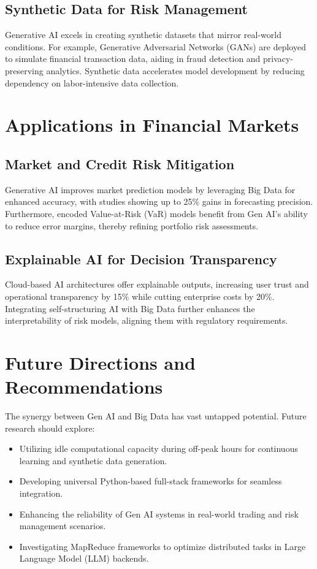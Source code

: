 \documentclass[a4paper,headinclude=on,footinclude=on,12pt,oneside]{scrbook}
\begin{document}
\subsection{Synthetic Data for Risk Management}
Generative AI excels in creating synthetic datasets that mirror real-world conditions. For example, Generative Adversarial Networks (GANs) are deployed to simulate financial transaction data, aiding in fraud detection and privacy-preserving analytics. Synthetic data accelerates model development by reducing dependency on labor-intensive data collection.

\section{Applications in Financial Markets}

\subsection{Market and Credit Risk Mitigation}
Generative AI improves market prediction models by leveraging Big Data for enhanced accuracy, with studies showing up to 25\% gains in forecasting precision. Furthermore, encoded Value-at-Risk (VaR) models benefit from Gen AI’s ability to reduce error margins, thereby refining portfolio risk assessments.

\subsection{Explainable AI for Decision Transparency}
Cloud-based AI architectures offer explainable outputs, increasing user trust and operational transparency by 15\% while cutting enterprise costs by 20\%. Integrating self-structuring AI with Big Data further enhances the interpretability of risk models, aligning them with regulatory requirements.

\section{Future Directions and Recommendations}
The synergy between Gen AI and Big Data has vast untapped potential. Future research should explore:
\begin{itemize}
	\item Utilizing idle computational capacity during off-peak hours for continuous learning and synthetic data generation.
	\item Developing universal Python-based full-stack frameworks for seamless integration.
	\item Enhancing the reliability of Gen AI systems in real-world trading and risk management scenarios.
	\item Investigating MapReduce frameworks to optimize distributed tasks in Large Language Model (LLM) backends.
\end{itemize}
\end{document}
